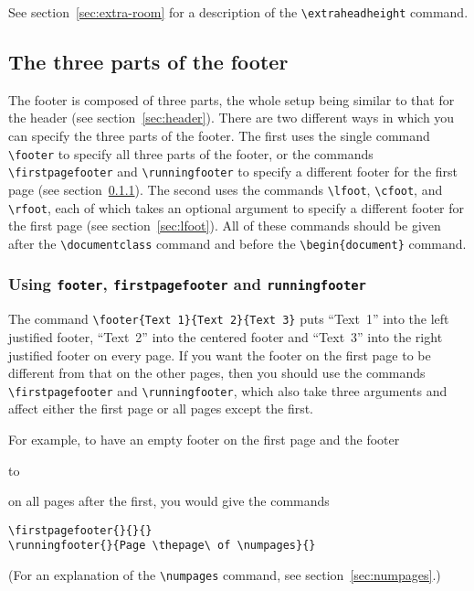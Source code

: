 \documentclass[12pt]{exam}
\def\samplefoot#1#2#3#4{%
  \begin{trivlist}
     \item[]
     \leavevmode
     #1
     \vskip 3pt

     \hbox to \textwidth{%
         \rlap{\parbox[t]{\textwidth}{\raggedright#2}}%
         \hfil\parbox[t]{\textwidth}{\centering#3}\hfil
         \llap{\parbox[t]{\textwidth}{\raggedleft#4}}%
  }%
  \end{trivlist}
}
\begin{document}
See section~\ref{sec:extra-room} for a description of the
\verb"\extraheadheight" command.



\subsection{The three parts of the footer}
\label{sec:footer}

The footer is composed of three parts, the whole setup being similar
to that for the header (see section~\ref{sec:header}).  There are two
different ways in which you can specify the three parts of the footer.
The first uses the single command \verb"\footer" to specify all three
parts of the footer, or the commands \verb"\firstpagefooter" and
\verb"\runningfooter" to specify a different footer for the first page
(see section~\ref{sec:runningfooter}).  The second uses the commands
\verb"\lfoot", \verb"\cfoot", and \verb"\rfoot", each of which takes
an optional argument to specify a different footer for the first page
(see section~\ref{sec:lfoot}).  All of these commands should be given
after the \verb"\documentclass" command and before the
\verb"\begin{document}" command.

\subsubsection{Using \texttt{footer}, \texttt{firstpagefooter}
   and \texttt{runningfooter}}
\label{sec:runningfooter}

The command \verb"\footer{Text 1}{Text 2}{Text 3}" puts ``Text~1''
into the left justified footer, ``Text~2'' into the centered footer
and ``Text~3'' into the right justified footer on every page.  If you
want the footer on the first page to be different from that on the
other pages, then you should use the commands \verb"\firstpagefooter"
and \verb"\runningfooter", which also take three arguments and affect
either the first page or all pages except the first.


For example, to have an empty footer on the first page and the footer
\samplefoot{}{}{Page 3 of 5}{}
on all pages after the first, you would give the commands
%
\begin{verbatim}
\firstpagefooter{}{}{}
\runningfooter{}{Page \thepage\ of \numpages}{}
\end{verbatim}
%
(For an explanation of the \verb"\numpages" command, see
section~\ref{sec:numpages}.)  
\end{document}
